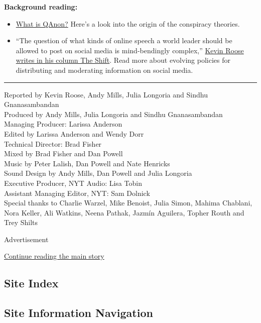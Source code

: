 \textbf{Background reading:}

\begin{itemize}
\item
  \href{https://www.nytimes.com/2018/08/01/us/politics/what-is-qanon.html?searchResultPosition=5}{What
  is QAnon?} Here's a look into the origin of the conspiracy theories.
\item
  ``The question of what kinds of online speech a world leader should be
  allowed to post on social media is mind-bendingly complex,''
  \href{https://www.nytimes.com/2020/05/29/technology/trump-twitter.html}{Kevin
  Roose writes in his column The Shift}. Read more about evolving
  policies for distributing and moderating information on social media.
\end{itemize}

\begin{center}\rule{0.5\linewidth}{\linethickness}\end{center}

Reported by Kevin Roose, Andy Mills, Julia Longoria and Sindhu
Gnanasambandan\\
Produced by Andy Mills, Julia Longoria and Sindhu Gnanasambandan\\
Managing Producer: Larissa Anderson\\
Edited by Larissa Anderson and Wendy Dorr\\
Technical Director: Brad Fisher\\
Mixed by Brad Fisher and Dan Powell\\
Music by Peter Lalish, Dan Powell and Nate Henricks\\
Sound Design by Andy Mills, Dan Powell and Julia Longoria\\
Executive Producer, NYT Audio: Lisa Tobin\\
Assistant Managing Editor, NYT: Sam Dolnick\\
Special thanks to Charlie Warzel, Mike Benoist, Julia Simon, Mahima
Chablani, Nora Keller, Ali Watkins, Neena Pathak, Jazmín Aguilera,
Topher Routh and Trey Shilts

Advertisement

\protect\hyperlink{after-bottom}{Continue reading the main story}

\hypertarget{site-index}{%
\subsection{Site Index}\label{site-index}}

\hypertarget{site-information-navigation}{%
\subsection{Site Information
Navigation}\label{site-information-navigation}}

